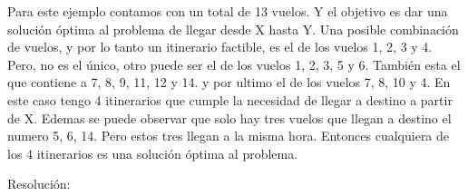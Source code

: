 \documentclass[a4paper]{article}
\begin{document}
Para este ejemplo contamos con un total de 13 vuelos. Y el objetivo es dar una solución óptima al problema de llegar desde X hasta Y. Una posible combinación de vuelos, y por lo tanto un itinerario factible, es el de los vuelos 1, 2, 3 y 4. Pero, no es el único, otro puede ser el de los vuelos 1,  2, 3, 5 y 6. También esta el que contiene a  7, 8, 9, 11, 12 y 14. y por ultimo el de los vuelos 7, 8, 10 y 4. En este caso tengo 4 itinerarios que cumple la necesidad de llegar a destino a partir de X. Edemas se puede observar que solo hay tres vuelos que llegan a destino el numero 5, 6, 14. Pero estos tres llegan a la misma hora. Entonces cualquiera de los 4 itinerarios es una solución óptima al problema.\newline \newline





{\noindent \Huge Resoluci\'on:} \newline \newline
\end{document}
